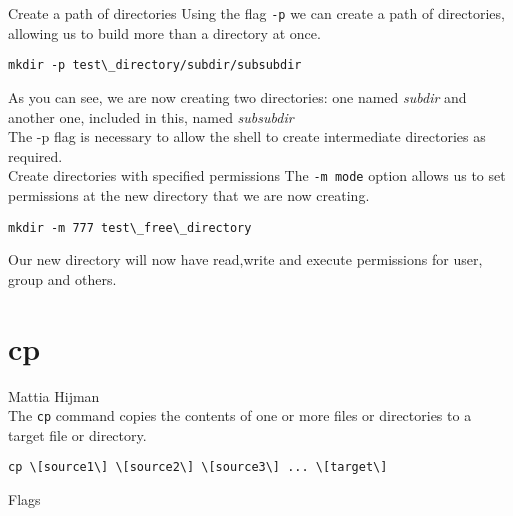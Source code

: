 \documentclass[hidelinks,12pt,a4paper,numbers=enddot]{scrartcl}
\begin{document}
Create a path of directories
Using the flag \texttt{-p} we can create a path of directories, allowing us
to build more than a directory at once.

\begin{verbatim}
mkdir -p test\_directory/subdir/subsubdir
\end{verbatim}

As you can see, we are now creating two directories: one named \emph{subdir} and
another one, included in this, named \emph{subsubdir}\\
The -p flag is necessary to allow the shell to create intermediate
directories as required.\\

Create directories with specified permissions
The \texttt{-m mode} option allows us to set permissions at the new directory
that we are now creating.

\begin{verbatim}
mkdir -m 777 test\_free\_directory
\end{verbatim}

Our new directory will now have read,write and execute permissions for user, group and others.

\section{cp}


\large Mattia Hijman \normalsize\\



The \texttt{cp} command copies the contents of one or more files or directories to a
target file or directory.\\

\begin{verbatim}
cp \[source1\] \[source2\] \[source3\] ... \[target\]
\end{verbatim}


Flags
\end{document}
